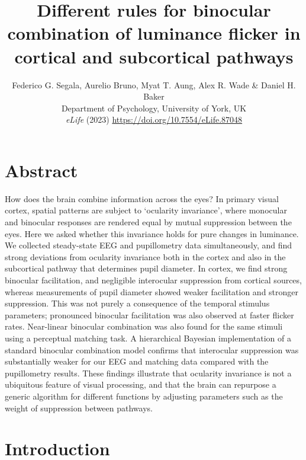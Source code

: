 \documentclass[
]{article}
\title{Different rules for binocular combination of luminance flicker in cortical and subcortical pathways}
\author{Federico G. Segala, Aurelio Bruno, Myat T. Aung, Alex R. Wade \& Daniel H. Baker\\
Department of Psychology, University of York, UK\\
\emph{eLife} (2023) \url{https://doi.org/10.7554/eLife.87048}}
\date{}
\begin{document}
\maketitle

\hypertarget{abstract}{%
\section{Abstract}\label{abstract}}

How does the brain combine information across the eyes? In primary visual cortex, spatial patterns are subject to `ocularity invariance', where monocular and binocular responses are rendered equal by mutual suppression between the eyes. Here we asked whether this invariance holds for pure changes in luminance. We collected steady-state EEG and pupillometry data simultaneously, and find strong deviations from ocularity invariance both in the cortex and also in the subcortical pathway that determines pupil diameter. In cortex, we find strong binocular facilitation, and negligible interocular suppression from cortical sources, whereas measurements of pupil diameter showed weaker facilitation and stronger suppression. This was not purely a consequence of the temporal stimulus parameters; pronounced binocular facilitation was also observed at faster flicker rates. Near-linear binocular combination was also found for the same stimuli using a perceptual matching task. A hierarchical Bayesian implementation of a standard binocular combination model confirms that interocular suppression was substantially weaker for our EEG and matching data compared with the pupillometry results. These findings illustrate that ocularity invariance is not a ubiquitous feature of visual processing, and that the brain can repurpose a generic algorithm for different functions by adjusting parameters such as the weight of suppression between pathways.

\hypertarget{introduction}{%
\section{Introduction}\label{introduction}}
\end{document}
